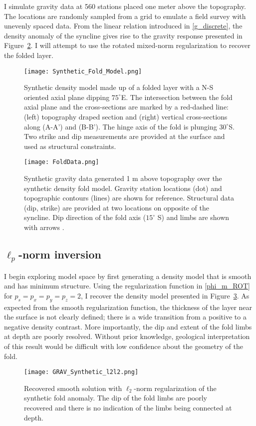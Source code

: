 I simulate gravity data at 560 stations placed one meter above the topography. The locations are randomly sampled from a grid to emulate a field survey with unevenly spaced data.
From the linear relation introduced in \eqref{g_discrete}, the density anomaly of the syncline gives rise to the gravity response presented in Figure~\ref{FoldData}.
I will attempt to use the rotated mixed-norm regularization to recover the folded layer.
\begin{figure}[h!]
\texttt{[image: Synthetic\_Fold\_Model.png]}
\caption{Synthetic density model made up of a folded layer with a N-S oriented axial plane dipping $75^\circ$E. The intersection between the fold axial plane and the cross-sections are marked by a red-dashed line: (left) topography draped section and (right) vertical cross-sections along (A-A') and (B-B'). The hinge axis of the fold is plunging $30^\circ$S. Two strike and dip measurements are provided at the surface and used as structural constraints.}
\label{FoldModel}
\end{figure}
\begin{figure}[h!]
\texttt{[image: FoldData.png]}
\caption{Synthetic gravity data generated 1 m above topography over the synthetic density fold model. Gravity station locations (dot) and topographic contours (lines) are shown for reference. Structural data (dip, strike) are provided at two locations on opposite of the syncline. Dip direction of the fold axis ($15^\circ$ S) and limbs are shown with arrows .}
\label{FoldData}
\end{figure}


\subsection{$\ell_p$-norm inversion}
I begin exploring model space by first generating a density model that is smooth and has minimum structure.
Using the regularization function in \eqref{phi_m_ROT} for $p_s=p_x=p_y=p_z=2$, I recover the density model presented in Figure~\ref{Synthetic_Fold_l2Model}. As expected from the smooth regularization function, the thickness of the layer near the surface is not clearly defined; there is a wide transition from a positive to a negative density contrast. More importantly, the dip and extent of the fold limbs at depth are poorly resolved. Without prior knowledge, geological interpretation of this result would be difficult with low confidence about the geometry of the fold.

\begin{figure}[h!]
\centering
\texttt{[image: GRAV\_Synthetic\_l2l2.png]}
\caption{Recovered smooth solution with $\ell_2$-norm regularization of the synthetic fold anomaly. The dip of the fold limbs are poorly recovered and there is no indication of the limbs being connected at depth.}\label{Synthetic_Fold_l2Model}
\end{figure}

